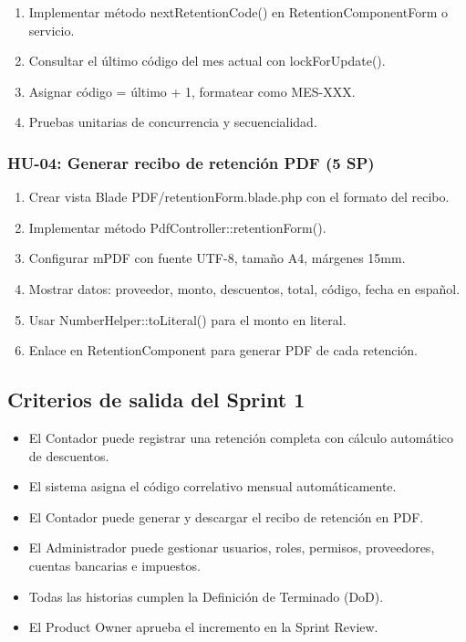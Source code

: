 \documentclass[stu]{apa7}
\begin{document}
\begin{enumerate}
    \item Implementar método nextRetentionCode() en RetentionComponentForm o servicio.
    \item Consultar el último código del mes actual con lockForUpdate().
    \item Asignar código = último + 1, formatear como MES-XXX.
    \item Pruebas unitarias de concurrencia y secuencialidad.
\end{enumerate}

\subsubsection{HU-04: Generar recibo de retención PDF (5 SP)}

\begin{enumerate}
    \item Crear vista Blade PDF/retentionForm.blade.php con el formato del recibo.
    \item Implementar método PdfController::retentionForm().
    \item Configurar mPDF con fuente UTF-8, tamaño A4, márgenes 15mm.
    \item Mostrar datos: proveedor, monto, descuentos, total, código, fecha en español.
    \item Usar NumberHelper::toLiteral() para el monto en literal.
    \item Enlace en RetentionComponent para generar PDF de cada retención.
\end{enumerate}

\subsection{Criterios de salida del Sprint 1}

\begin{itemize}
    \item El Contador puede registrar una retención completa con cálculo automático de descuentos.
    \item El sistema asigna el código correlativo mensual automáticamente.
    \item El Contador puede generar y descargar el recibo de retención en PDF.
    \item El Administrador puede gestionar usuarios, roles, permisos, proveedores, cuentas bancarias e impuestos.
    \item Todas las historias cumplen la Definición de Terminado (DoD).
    \item El Product Owner aprueba el incremento en la Sprint Review.
\end{itemize}
\end{document}
